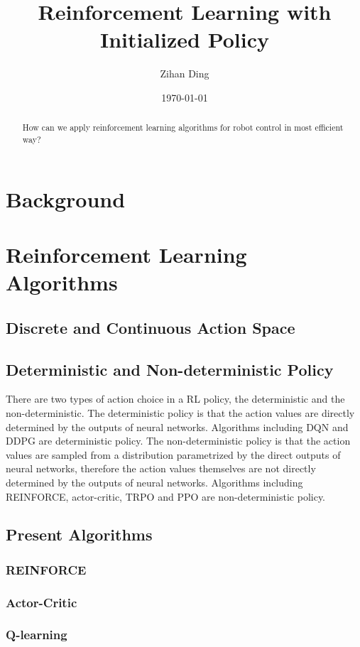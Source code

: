 \documentclass{article}
\title{Reinforcement Learning with Initialized Policy }
\author{Zihan Ding}
\date{\today}
\begin{document}
\maketitle

\tableofcontents

\begin{abstract}
How can we apply reinforcement learning algorithms for robot control in most efficient way?
\end{abstract}
\section{Background}\label{Background}


\section{Reinforcement Learning Algorithms}
\subsection{Discrete and Continuous Action Space}
\subsection{Deterministic and Non-deterministic Policy}
There are two types of action choice in a RL policy, the deterministic and the non-deterministic. The deterministic policy is that the action values are directly determined by the outputs of neural networks. Algorithms including DQN and DDPG are deterministic policy. The non-deterministic policy is that the action values are sampled from a distribution parametrized by the direct outputs of neural networks, therefore the action values themselves are not directly determined by the outputs of neural networks. Algorithms including REINFORCE, actor-critic, TRPO and PPO are non-deterministic policy.
\subsection{Present Algorithms}
\subsubsection{REINFORCE}
\subsubsection{Actor-Critic}
\subsubsection{Q-learning}
\end{document}

